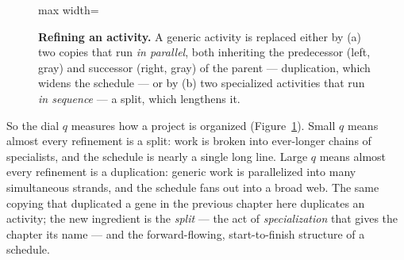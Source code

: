 \begin{figure}[t]
\centering
\begin{adjustbox}{max width=\linewidth}\end{adjustbox}
\caption{\textbf{Refining an activity.} A generic activity is replaced either by
(a) two copies that run \emph{in parallel}, both inheriting the predecessor (left,
gray) and successor (right, gray) of the parent --- duplication, which widens the
schedule --- or by (b) two specialized activities that run \emph{in sequence} --- a
split, which lengthens it.}
\label{fig:proj-dupsplit}
\end{figure}

So the dial $q$ measures how a project is organized (Figure~\ref{fig:proj-dupsplit}). Small $q$ means almost every
refinement is a split: work is broken into ever-longer chains of specialists, and
the schedule is nearly a single long line. Large $q$ means almost every
refinement is a duplication: generic work is parallelized into many simultaneous
strands, and the schedule fans out into a broad web. The same copying that
duplicated a gene in the previous chapter here duplicates an activity; the new
ingredient is the \emph{split} --- the act of \emph{specialization} that gives the
chapter its name --- and the forward-flowing, start-to-finish structure of a
schedule.


